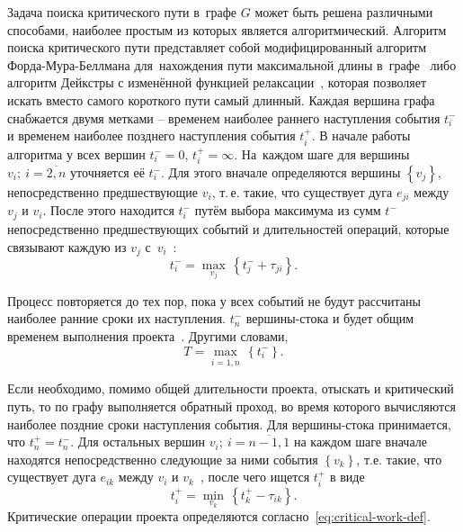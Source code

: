 Задача поиска критического пути в~графе $G$ может быть решена различными способами, наиболее простым из которых является алгоритмический. Алгоритм поиска критического пути представляет собой модифицированный алгоритм Форда-Мура-Беллмана для~нахождения пути максимальной длины в~графе~\cite{Graph_Redbook, Basaker_Saati} либо алгоритм Дейкстры с изменённой функцией релаксации~\cite{Kormen, Indians_CPM}, которая позволяет искать вместо самого короткого пути самый длинный. Каждая вершина графа снабжается двумя метками – временем наиболее раннего наступления события $t_{i}^{-}$ и временем наиболее позднего наступления события $t_{i}^{+}$. В начале работы алгоритма у всех вершин $t_{i}^{-}=0$, $t_{i}^{+}=\infty $. На~каждом шаге для вершины $v_i;\ i=\overline{2,n}$ уточняется её $t_{i}^{-}$. Для этого вначале определяются вершины $\left\{ v_j \right\}$, непосредственно предшествующие $v_i$, т.\,е. такие, что существует дуга $e_{ji}$ между $v_j$ и $v_i$. После этого находится $t_{i}^{-}$ путём выбора максимума из сумм $t^{-}$ непосредственно предшествующих событий и длительностей операций, которые связывают каждую из $v_j$ с~$v_i$~\cite{Eddous}:
\begin{equation}
\label{eq:earliest-event-time}
  t_{i}^{-}=\underset{v_j}{\mathop{\max }}\,\left\{ t_{j}^{-}+\tau_{ji} \right\}.
\end{equation}

Процесс повторяется до тех пор, пока у всех событий не будут рассчитаны наиболее ранние сроки их наступления. $t_{n}^{-}$ вершины-стока и будет общим временем выполнения проекта~\cite{Basaker_Saati}. Другими словами,
\begin{equation}
\label{eq:total-project-time}
  T=\underset{i=\overline{1,n}}{\mathop{\max }}\,\left\{ t_{i}^{-} \right\}.
\end{equation}

Если необходимо, помимо общей длительности проекта, отыскать и критический путь, то по графу выполняется обратный проход, во время которого вычисляются наиболее поздние сроки наступления события. Для вершины-стока принимается, что $t_{n}^{+}=t_{n}^{-}$. Для остальных вершин $v_i;\ i=\overline{n-1,1}$ на каждом шаге вначале находятся непосредственно следующие за ними события $\left\{ v_k \right\}$, т.е. такие, что существует дуга $e_{ik}$ между $v_i$ и $v_k$~\cite{Graph_Redbook}, после чего ищется $t_{i}^{+}$ в виде
\begin{equation}
\label{eq:latest-event-time}
  t_{i}^{+}=\underset{v_k}{\mathop{\min }}\,\left\{ t_{k}^{+}-{{\tau }_{ik}} \right\}.
\end{equation}
Критические операции проекта определяются согласно~\eqref{eq:critical-work-def}.

